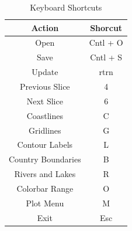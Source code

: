 \documentclass[a4paper,12pt]{article}
\begin{document}
\begin{table}[h]
\caption{Keyboard Shortcuts}
\centering
\begin{tabular}{c c}
\hline\hline
Action & Shorcut \\ [0.5ex]
\hline
Open & Cntl + O \\
Save & Cntl + S \\
Update & rtrn \\
Previous Slice & 4 \\
Next Slice & 6 \\
Coastlines & C \\
Gridlines & G \\
Contour Labels & L \\
Country Boundaries & B \\
Rivers and Lakes & R \\
Colorbar Range & O \\
Plot Menu & M \\
Exit & Esc \\ [1ex]
\hline
\end{tabular}
\label{table:shortcuts}
\end{table}
\end{document}
